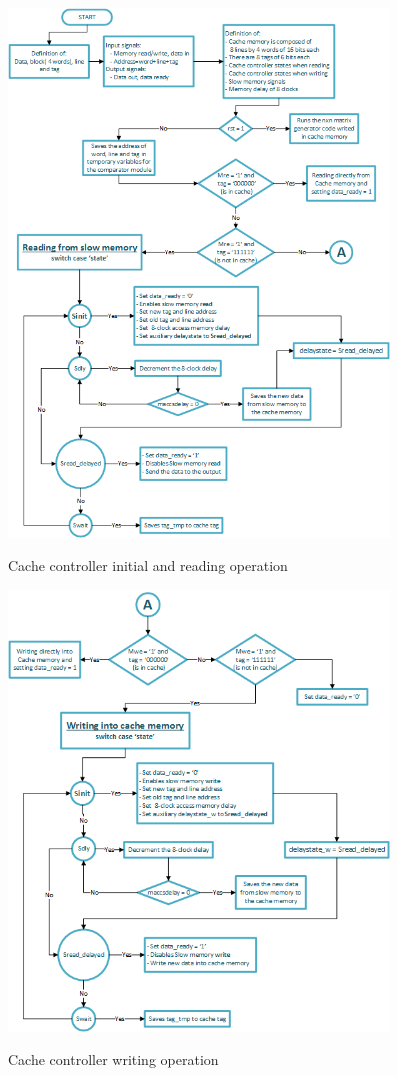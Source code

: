 \documentclass[]{article}
\begin{document}
\begin{figure}[H]
	\caption{Cache controller initial and reading operation }
	\centering
	\includegraphics[width=0.9\textwidth]{cache_controller_a}
	\label{fig:10}
\end{figure}

\begin{figure}[H]
	\caption{Cache controller writing operation}
	\centering
	\includegraphics[width=0.9\textwidth]{cache_controller_b}
	\label{fig:11}
\end{figure}
\end{document}
